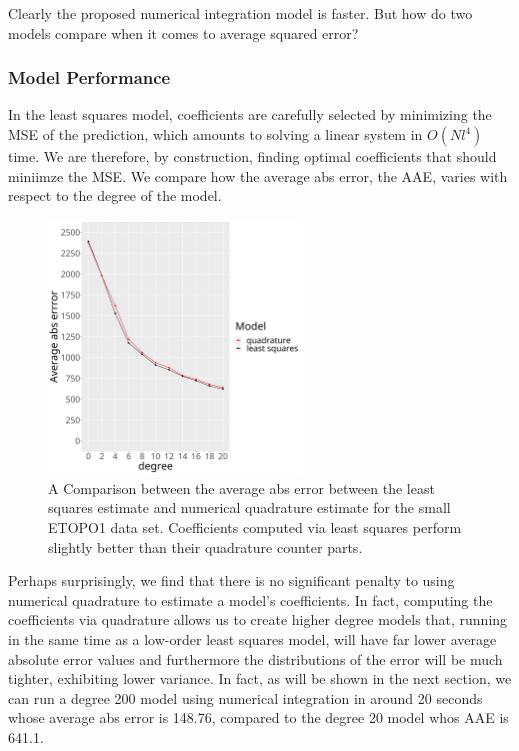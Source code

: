 \documentclass[a4paper]{article}
\theoremstyle{definition}
\begin{document}
Clearly the proposed numerical integration model is faster. But how do two models compare when it comes to average squared error? 


\newpage
\subsubsection{Model Performance}

In the least squares model, coefficients are carefully selected by minimizing the MSE of the prediction, which amounts to solving a linear system in $O(Nl^4)$ time. We are therefore,
by construction, finding optimal coefficients that should miniimze the MSE. We compare how the average abs error, the AAE, varies with
respect to the degree of the model.


\begin{figure}[h!]
    \centering
    \includegraphics[width=0.6\textwidth]{media/diff_error.png}
    \caption{A Comparison between the average abs error between the least squares estimate and numerical quadrature estimate for the small ETOPO1 data set. Coefficients computed via least squares
    perform slightly better than their quadrature counter parts.}
    \label{fig:error}
\end{figure}

Perhaps surprisingly, we find that there is no significant penalty to using numerical quadrature to estimate a model's coefficients. In fact, computing the coefficients via quadrature allows us to 
create higher degree models that, running in the same time as a low-order least squares model, will have far lower average absolute error values and furthermore the distributions of the error will be
much tighter, exhibiting lower variance. In fact, as will be shown in the next section, we can run a degree 200 model using numerical integration in around 20 seconds whose average abs error
is 148.76, compared to the degree 20 model whos AAE is 641.1.
\end{document}
